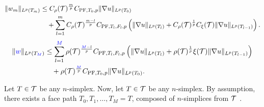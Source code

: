 \documentclass[10pt,a4paper]{article}
\newcommand\cye[1]{%
\protect\leavevmode
\begingroup
    \color{blue}%
    #1%
\endgroup
}
\begin{document}
        \begin{align*}
        \| w_{m} \|_{L^{p}(T_m)}
        &\leq 
        C_\rho({\mathcal T})^{\frac m p}
        C_{{\rm PF},T_{0},p} 
        \| \nabla u \|_{L^{p}( T_{0} )}
        \\&\quad 
        +
        \sum_{l=1}^{m} 
        C_\rho({\mathcal T})^{\frac {m-l} p}
        C_{{\rm PF},T_{l},F_{l},p} 
        \left( 
            \| \nabla u \|_{L^{p}(T_{l})} 
            +
            C_\rho({\mathcal T})^{\frac {1} p}
            C_\xi({\mathcal T})
            \| \nabla u \|_{L^{p}(T_{l-1})} 
        \right)
        .
    \end{align*}
    \begin{align*}
        \| \cye{w} \|_{L^{p}(T_{\cye{M}})}
        &\leq 
        \sum_{l=1}^{\cye{M}} 
        \rho(\calT)^{\frac {\cye{M}-l} p}
        C_{\PF,T_{l},F_{l},p} 
        \left( 
            \| \nabla u \|_{L^{p}(T_{l})} 
            +
            \rho(\calT)^{\frac {1} p}
            \xi(\calT)
            \| \nabla u \|_{L^{p}(T_{l-1})} 
        \right)
        \\&\quad 
        + \rho(\calT)^{\frac{\cye{M}}{p}}
        C_{\PF,T_{0},p} 
        \| \nabla u \|_{L^{p}( T_{0} )}
        .
    \end{align*}

    Let $T \in {\mathcal T}$ be any $n$-simplex. 
    Now, let $T \in {\mathcal T}$ be any $n$-simplex. 
    By assumption, there exists a \cye{face} path $T_0, T_1, \dots, T_M = T$, composed of $n$-simplices \cye{from ${\mathcal T}$}. 
    
\end{document}
